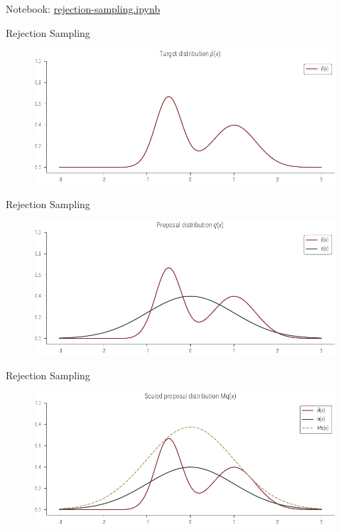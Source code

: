 \documentclass{beamer}
\begin{document}
    \begin{frame}
        Notebook: \url{rejection-sampling.ipynb}
    \end{frame}

   \begin{frame}{Rejection Sampling}
    \begin{figure}
        \centering
        \includegraphics[scale = 0.75]{../figures/sampling/rejection-sampling--1.0-False-False-False-False-False-False-False-False.pdf}
    \end{figure}
    
   \end{frame}

    \begin{frame}{Rejection Sampling}
        \begin{figure}
            \centering
            \includegraphics[scale = 0.75]{../figures/sampling/rejection-sampling--1.0-True-False-False-False-False-False-False-False.pdf}
        \end{figure}
    \end{frame}

    \begin{frame}{Rejection Sampling}
        \begin{figure}
            \centering
            \includegraphics[scale = 0.75]{../figures/sampling/rejection-sampling--1.0-True-True-False-False-False-False-False-False.pdf}
        \end{figure}
    \end{frame}
\end{document}
